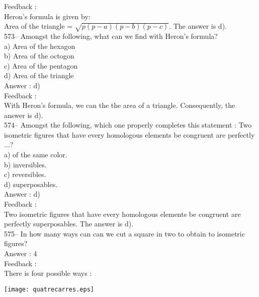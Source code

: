 \documentclass[letterpaper, 12pt]{article}
\begin{document}
Feedback : \\
Heron's formula is given by:\\
Area of the triangle = $\sqrt{p\left( p-a\right) \left( p-b\right) \left(
p-c\right) }$.  The answer is d).\\

573-- Amongst the following, what can we find with Heron's formula?\\
a) Area of the hexagon\\
b) Area of the octogon\\
c) Area of the pentagon\\
d) Area of the triangle\\

Answer : d) \\

Feedback : \\
With Heron's formula, we can the the area of a triangle. Consequently, the answer is d).\\



574-- Amongst the following, which one properly completes this statement : \og Two isometric figures that have every homologous elements be congruent are perfectly $\ldots$\fg ?\\
a) of the same color.\\
b) inversibles.\\
c) reversibles.\\
d) superposables.\\

Answer : d)\\

Feedback : \\
Two isometric figures that have every homologous elements be congruent are perfectly superposables.  The answer is d).\\

575-- In how many ways can can we cut a square in two to obtain to isometric figures?\\

Answer : 4\\

Feedback : \\
There is four possible ways :   \\
    \begin{center}
    \texttt{[image: quatrecarres.eps]}
    \end{center}
\end{document}
